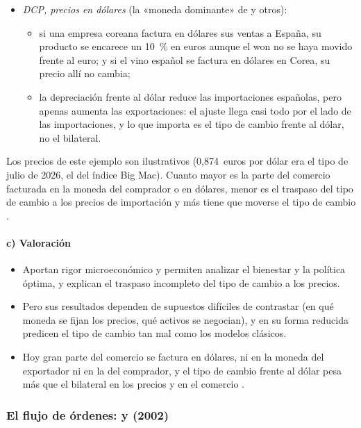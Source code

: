 \documentclass[11pt]{article}
\begin{document}
\begin{anotaciones}[unbreakable]
\begin{itemize}
\begin{itemize}
  \end{itemize}
\item \emph{DCP, precios en dólares} (la «moneda dominante» de  y otros):
  \begin{itemize}
  \item si una empresa coreana factura en dólares sus ventas a España, su producto se encarece un 10~\% en euros aunque el won no se haya movido frente al euro; y si el vino español se factura en dólares en Corea, su precio allí no cambia;
  \item la depreciación frente al dólar reduce las importaciones españolas, pero apenas aumenta las exportaciones: el ajuste llega casi todo por el lado de las importaciones, y lo que importa es el tipo de cambio frente al dólar, no el bilateral\nocite{Gopinath2020DCP}.
  \end{itemize}
\end{itemize}
Los precios de este ejemplo son ilustrativos (0,874~euros por dólar era el tipo de julio de 2026, el del índice Big Mac). Cuanto mayor es la parte del comercio facturada en la moneda del comprador o en dólares, menor es el traspaso del tipo de cambio a los precios de importación y más tiene que moverse el tipo de cambio  .
\end{anotaciones}

\paragraph{c) Valoración}
\begin{itemize}
\item Aportan rigor microeconómico y permiten analizar el bienestar y la política óptima, y explican el traspaso incompleto del tipo de cambio a los precios.
\item Pero sus resultados dependen de supuestos difíciles de contrastar (en qué moneda se fijan los precios, qué activos se negocian), y en su forma reducida predicen el tipo de cambio tan mal como los modelos clásicos.
\item Hoy gran parte del comercio se factura en dólares, ni en la moneda del exportador ni en la del comprador, y el tipo de cambio frente al dólar pesa más que el bilateral en los precios y en el comercio\nocite{Gopinath2020DCP}  .
\end{itemize}

\subsubsection{El flujo de órdenes:  y  (2002)}\label{sec:evans-lyons}
\end{document}
